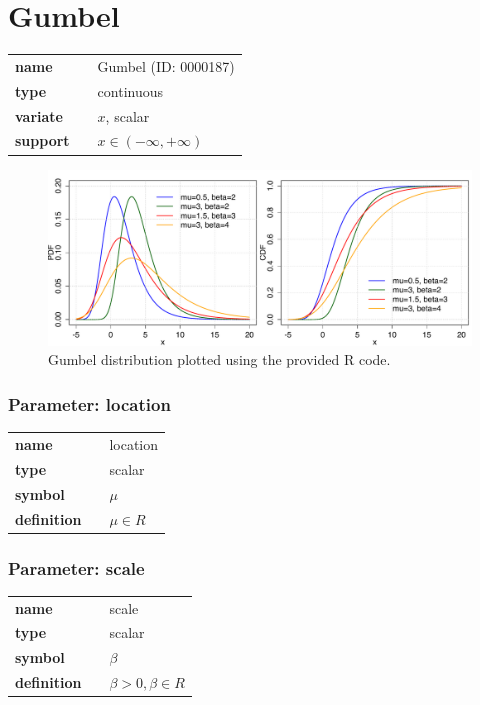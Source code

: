 \section*{Gumbel} 

  \bigskip 

\begin{tabular}{p{2cm}cl}
\textbf{name} & & Gumbel (ID: 0000187)\\ 
 
\textbf{type} & & continuous \\ 

\textbf{variate} & & $x$, scalar \\ 

\textbf{support} & & $x \in (-\infty,+\infty)$
\end{tabular}

\begin{figure}[ht!]
\centering
  \includegraphics[width=140mm]{pics/Gumbel.pdf}
 \caption{Gumbel distribution plotted using the provided R code.}
 \label{fig:Gumbel}
\end{figure}

\subsubsection*{Parameter: location}

\noindent\begin{tabular}{p{2cm}cl}
\textbf{name} & & location \\
\textbf{type} & & scalar \\
\textbf{symbol} & & $\mu$  \\
\textbf{definition} & & $\mu \in  R$
\end{tabular}
\subsubsection*{Parameter: scale}

\noindent\begin{tabular}{p{2cm}cl}
\textbf{name} & & scale \\
\textbf{type} & & scalar \\
\textbf{symbol} & & $\beta$  \\
\textbf{definition} & & $\beta>0, \beta \in  R$
\end{tabular}
